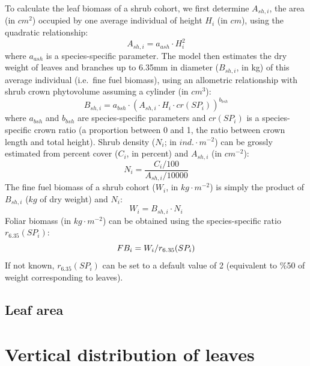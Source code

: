 \documentclass[]{book}
\begin{document}
To calculate the leaf biomass of a shrub cohort, we first determine \(A_{sh,i}\), the area (in \(cm^2\)) occupied by one average individual of height \(H_{i}\) (in \(cm\)), using the quadratic relationship:
\begin{equation}
A_{sh,i} = a_{ash} \cdot H_{i}^2
\end{equation}
where \(a_{ash}\) is a species-specific parameter. The model then estimates the dry weight of leaves and branches up to 6.35mm in diameter (\(B_{sh,i}\), in kg) of this average individual (i.e.~fine fuel biomass), using an allometric relationship with shrub crown phytovolume assuming a cylinder (in \(cm^3\)):
\begin{equation}
B_{sh,i} = a_{bsh} \cdot (A_{sh,i}\cdot H_{i}\cdot cr(SP_i))^{b_{bsh}}
\end{equation}
where \(a_{bsh}\) and \(b_{bsh}\) are species-specific parameters and \(cr(SP_i)\) is a species-specific crown ratio (a proportion between 0 and 1, the ratio between crown length and total height). Shrub density (\(N_{i}\); in \(ind.\cdot m^{-2}\)) can be grossly estimated from percent cover (\(C_{i}\), in percent) and \(A_{sh,i}\) (in \(cm^{-2}\)):
\begin{equation}
N_{i} = \frac{C_{i}/100}{A_{sh,i}/10000}
\end{equation}
The fine fuel biomass of a shrub cohort (\(W_{i}\), in \(kg \cdot m^{-2}\)) is simply the product of \(B_{sh,i}\) (\(kg\) of dry weight) and \(N_{i}\):
\begin{equation}
W_{i} =  B_{sh,i}\cdot N_{i}
\label{eq:shrubloading}
\end{equation}
Foliar biomass (in \(kg \cdot m^{-2}\)) can be obtained using the species-specific ratio \(r_{6.35}(SP_i)\):
\begin{equation}
FB_{i} =  W_{i}/r_{6.35}(SP_i)\\
\label{eq:shrubfoliarbiomass}
\end{equation}
If not known, \(r_{6.35}(SP_i)\) can be set to a default value of 2 (equivalent to \%50 of weight corresponding to leaves).

\hypertarget{leaf-area}{%
\subsection{Leaf area}\label{leaf-area}}

\hypertarget{vertical-distribution-of-leaves}{%
\section{Vertical distribution of leaves}\label{vertical-distribution-of-leaves}}
\end{document}
